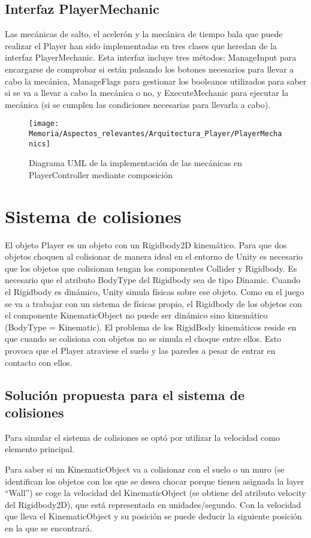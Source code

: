 \subsection{Interfaz PlayerMechanic}
Las mecánicas de salto, el acelerón y la mecánica de tiempo bala que puede realizar el Player han sido implementadas en tres clases que heredan de la interfaz PlayerMechanic. Esta interfaz incluye tres métodos: ManageInput para encargarse de comprobar si están pulsando los botones necesarios para llevar a cabo la mecánica, ManageFlags para gestionar los booleanos utilizados para saber si se va a llevar a cabo la mecánica o no, y ExecuteMechanic para ejecutar la mecánica (si se cumplen las condiciones necesarias para llevarla a cabo).

\begin{figure}[h]
\centering
\texttt{[image: Memoria/Aspectos\_relevantes/Arquitectura\_Player/PlayerMechanics]}
\caption{Diagrama UML de la implementación de las mecánicas en PlayerController mediante composición}
\end{figure}

\section{Sistema de colisiones}
El objeto Player es un objeto con un Rigidbody2D kinemático. Para que dos objetos choquen al colisionar de manera ideal en el entorno de Unity es necesario que los objetos que colisionan tengan los componentes Collider y Rigidbody. Es necesario que el atributo BodyType del Rigidbody sea de tipo Dinamic. Cuando el Rigidbody es dinámico, Unity simula físicas sobre ese objeto. Como en el juego se va a trabajar con un sistema de físicas propio, el Rigidbody de los objetos con el componente KinematicObject no puede ser dinámico sino kinemático (BodyType = Kinematic). El problema de los RigidBody kinemáticos reside en que cuando se colisiona con objetos no se simula el choque entre ellos. Esto provoca que el Player atraviese el suelo y las paredes a pesar de entrar en contacto con ellos.

\subsection{Solución propuesta para el sistema de colisiones}
Para simular el sistema de colisiones se optó por utilizar la velocidad como elemento principal.

Para saber si un KinematicObject va a colisionar con el suelo o un muro (se identifican los objetos con los que se desea chocar porque tienen asignada la layer “Wall”) se coge la velocidad del KinematicObject (se obtiene del atributo velocity del Rigidbody2D), que está representada en unidades/segundo. Con la velocidad que lleva el KinematicObject y su posición se puede deducir la siguiente posición en la que se encontrará.

